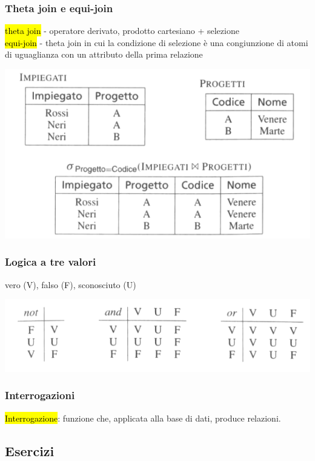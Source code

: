 \documentclass[a4paper]{article}
\begin{document}
\subsubsection{Theta join e equi-join}
\hl{theta join} - operatore derivato, prodotto cartesiano + selezione\medskip\\
\hl{equi-join} - theta join in cui la condizione di selezione è una congiunzione di atomi di uguaglianza con un attributo della prima relazione
\begin{center}
      \includegraphics[scale=0.45]{img/ar10.png}
\end{center}

\subsubsection{Logica a tre valori}
vero (V), falso (F), sconosciuto (U)
\begin{center}
      \includegraphics[scale=0.45]{img/ar11.png}
\end{center}

\subsubsection{Interrogazioni}
\hl{Interrogazione}: funzione che, applicata alla base di dati, produce relazioni.

\subsection{Esercizi}
\end{document}
